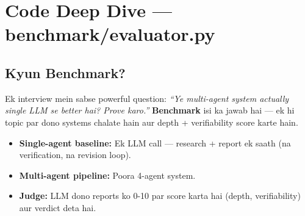 \documentclass[11pt, a4paper]{article}
\begin{document}
\section{Code Deep Dive --- benchmark/evaluator.py}

\subsection{Kyun Benchmark?}

\begin{storybox}
Ek interview mein sabse powerful question: \textit{``Ye multi-agent system actually single LLM se better hai? Prove karo.''} \textbf{Benchmark} isi ka jawab hai --- ek hi topic par dono systems chalate hain aur depth + verifiability score karte hain.

\begin{itemize}
\item \textbf{Single-agent baseline:} Ek LLM call --- research + report ek saath (na verification, na revision loop).
\item \textbf{Multi-agent pipeline:} Poora 4-agent system.
\item \textbf{Judge:} LLM dono reports ko 0-10 par score karta hai (depth, verifiability) aur verdict deta hai.
\end{itemize}
\end{storybox}
\end{document}
